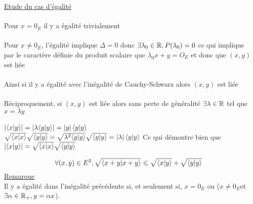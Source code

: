 \begin{dem}
\begin{itemize}
    \end{itemize}
    \underline{Etude du cas d'égalité}\\~\\
    Pour \( x = 0_E\) il y a égalité trivialement\\~\\
    Pour \(x \neq 0_E\), l'égalité implique \(\Delta = 0\) donc \(\exists \lambda_0 \in \mathbb{R}, P(\lambda_0) = 0\) ce qui implique par le caractère définie du produit scalaire que \(\lambda_0 x + y = O_E\) et donc que \((x,y)\) est liée\\~\\
    Ainsi si il y a égalité avec l'inégalité de Cauchy-Schwarz alors \((x,y)\) est liée\\~\\
    Réciproquement, si \((x,y)\) est liée alors sans perte de généralité \(\exists \lambda \in \mathbb{R}\) tel que \(x = \lambda y\)\\~\\
    \(\left\lvert\langle x | y \rangle\right\rvert = \left\lvert\lambda \langle y | y \rangle\right\rvert = \left\lvert y\right\rvert\langle y | y \rangle\)\\
    \(\sqrt{\langle x | x \rangle}\sqrt{\langle y | y \rangle} = \sqrt{\lambda^2\langle y | y \rangle}\sqrt{\langle y | y \rangle} = \left\lvert\lambda\right\rvert\langle y | y \rangle\)
    Ce qui démontre bien que \(\left\lvert\langle x | y \rangle\right\rvert =\sqrt{\langle x | x \rangle}\sqrt{\langle y | y \rangle} \)
\end{dem}
\begin{defprop}
    \[\forall (x, y) \in E^2, \sqrt{\langle x + y | x+y \rangle} \leqslant \sqrt{\langle x | y \rangle} + \sqrt{\langle y | y \rangle}\]
    \underline{Remarque}\\
    Il y a égalité dans l’inégalité précédente si, et seulement si, \(x = 0_E\) ou (\(x\neq 0_E \)et \(\exists \alpha \in \mathbb{R}_+, y = \alpha x\)).
\end{defprop}
